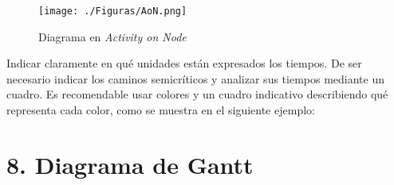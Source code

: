 \documentclass[11pt]{charter}
\begin{document}
\begin{figure}[htpb]
\centering 
\texttt{[image: ./Figuras/AoN.png]}
\caption{Diagrama en \textit{Activity on Node}}
\label{fig:AoN}
\end{figure}

Indicar claramente en qué unidades están expresados los tiempos.
De ser necesario indicar los caminos semicríticos y analizar sus tiempos mediante un cuadro.
Es recomendable usar colores y un cuadro indicativo describiendo qué representa cada color, como se muestra en el siguiente ejemplo:



\section{8. Diagrama de Gantt}
\label{sec:gantt}
\end{document}
